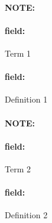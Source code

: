 \documentclass[12pt]{article}
\newenvironment{note}{\paragraph{NOTE:}}{}
\newenvironment{field}{\paragraph{field:}}{}
\begin{document}
\begin{note}

\begin{field}
Term 1
\end{field}

\begin{field}
Definition 1
\end{field}


\end{note}


\begin{note}

\begin{field}
Term 2
\end{field}

\begin{field}
Definition 2
\end{field}


\end{note}
\end{document}
